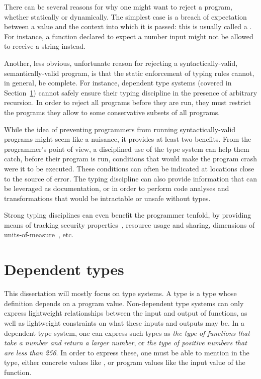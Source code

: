 There can be several reasons for why one might want to reject a program, whether
statically or dynamically.  The simplest case is a breach of expectation between
a value and the context into which it is passed: this is usually called a
.  For instance, a function declared to expect a number input
might not be allowed to receive a string instead.

Another, less obvious, unfortunate reason for rejecting a syntactically-valid,
semantically-valid program, is that the static enforcement of typing rules
cannot, in general, be complete.  For instance, dependent type systems (covered
in Section~\ref{dependent-types}) cannot safely ensure their typing discipline
in the presence of arbitrary recursion.  In order to reject all 
programs before they are run, they must restrict the programs they allow to some
conservative subsets of all  programs.

While the idea of preventing programmers from running syntactically-valid
programs might seem like a nuisance, it provides at least two benefits.  From
the programmer's point of view, a disciplined use of the type system can help
them catch, before their program is run, conditions that would make the program
crash were it to be executed.  These conditions can often be indicated at
locations close to the source of error.  The typing discipline can also provide
information that can be leveraged as documentation, or in order to perform code
analyses and transformations that would be intractable or unsafe without types.

Strong typing disciplines can even benefit the programmer tenfold, by providing
means of tracking security properties~, resource usage
and sharing, dimensions of
units-of-measure~, etc.

\section{Dependent types}
\label{dependent-types}

This dissertation will mostly focus on  type systems.  A
 type is a type whose definition depends on a program value.
Non-dependent type systems can only express lightweight relationships between
the input and output of functions, as well as lightweight constraints on what
these inputs and outputs may be.  In a dependent type system, one can express
such types as \textit{the type of functions that take a number and return a
larger number}, or \textit{the type of positive numbers that are less than 256}.
In order to express these, one must be able to mention in the type, either
concrete values like , or program values like the input value of
the function.

